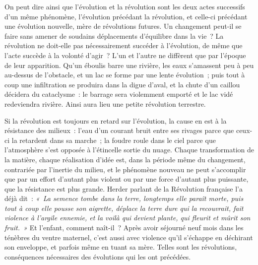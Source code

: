 \documentclass[french,twoside]{book} %
\begin{document}
On peut dire ainsi que l’évolution et la révolution sont les deux actes successifs d’un même phénomène, l’évolution précédant la révolution, et celle-ci précédant une évolution nouvelle, mère de révolutions futures. Un changement peut-il se faire sans amener de soudains déplacements d’équilibre dans la vie ? La révolution ne doit-elle pas nécessairement succéder à l’évolution, de même que l’acte succède à la volonté d’agir ? L’un et l’autre ne diffèrent que par l’époque de leur apparition. Qu’un éboulis barre une rivière, les eaux s’amassent peu à peu au-dessus de l’obstacle, et un lac se  forme par une lente évolution ; puis tout à coup une infiltration se produira dans la digue d’aval, et la chute d’un caillou décidera du cataclysme : le barrage sera violemment emporté et le lac vidé redeviendra rivière. Ainsi aura lieu une petite révolution terrestre.\par
Si la révolution est toujours en retard sur l’évolution, la cause en est à la résistance des milieux : l’eau d’un courant bruit entre ses rivages parce que ceux-ci la retardent dans sa marche ; la foudre roule dans le ciel parce que l’atmosphère s’est opposée à l’étincelle sortie du nuage. Chaque transformation de la matière, chaque réalisation d’idée est, dans la période même du changement, contrariée par l’inertie du milieu, et le phénomène nouveau ne peut s’accomplir  que par un effort d’autant plus violent ou par une force d’autant plus puissante, que la résistance est plus grande. Herder parlant de la Révolution française l’a déjà dit : \emph{« La semence tombe dans la terre, longtemps elle paraît morte, puis tout à coup elle pousse son aigrette, déplace la terre dure qui la recouvrait, fait violence à l’argile ennemie, et la voilà qui devient plante, qui fleurit et mûrit son fruit. »} Et l’enfant, comment naît-il ? Après avoir séjourné neuf mois dans les ténèbres du ventre maternel, c’est aussi avec violence qu’il s’échappe en déchirant son enveloppe, et parfois même en tuant sa mère. Telles sont les révolutions, conséquences nécessaires des évolutions qui les ont précédées.\par
\end{document}
